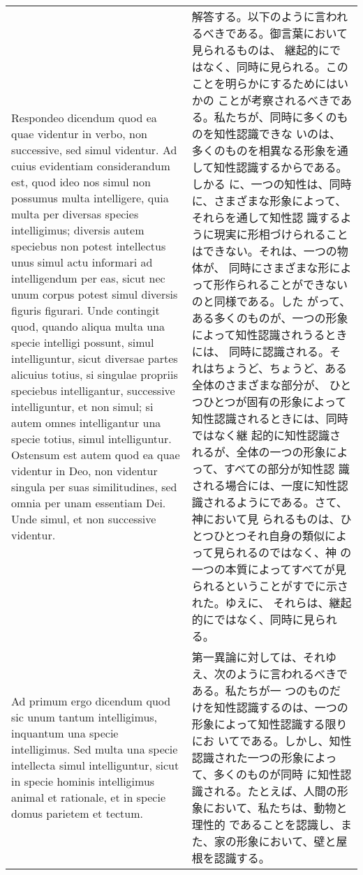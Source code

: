 \documentclass[10pt]{jsarticle} %
\begin{document}
\begin{longtable}{p{21em}p{21em}}
{\sc Respondeo dicendum} quod ea quae videntur in verbo, non
successive, sed simul videntur. Ad cuius evidentiam considerandum est,
quod ideo nos simul non possumus multa intelligere, quia multa per
diversas species intelligimus; diversis autem speciebus non potest
intellectus unus simul actu informari ad intelligendum per eas, sicut
nec unum corpus potest simul diversis figuris figurari. Unde contingit
quod, quando aliqua multa una specie intelligi possunt, simul
intelliguntur, sicut diversae partes alicuius totius, si singulae
propriis speciebus intelligantur, successive intelliguntur, et non
simul; si autem omnes intelligantur una specie totius, simul
intelliguntur. Ostensum est autem quod ea quae videntur in Deo, non
videntur singula per suas similitudines, sed omnia per unam essentiam
Dei. Unde simul, et non successive videntur.


&

解答する。以下のように言われるべきである。御言葉において見られるものは、
継起的にではなく、同時に見られる。このことを明らかにするためにはいかの
ことが考察されるべきである。私たちが、同時に多くのものを知性認識できな
いのは、多くのものを相異なる形象を通して知性認識するからである。しかる
に、一つの知性は、同時に、さまざまな形象によって、それらを通して知性認
識するように現実に形相づけられることはできない。それは、一つの物体が、
同時にさまざまな形によって形作られることができないのと同様である。した
がって、ある多くのものが、一つの形象によって知性認識されうるときには、
同時に認識される。それはちょうど、ちょうど、ある全体のさまざまな部分が、
ひとつひとつが固有の形象によって知性認識されるときには、同時ではなく継
起的に知性認識されるが、全体の一つの形象によって、すべての部分が知性認
識される場合には、一度に知性認識されるようにである。さて、神において見
られるものは、ひとつひとつそれ自身の類似によって見られるのではなく、神
の一つの本質によってすべてが見られるということがすでに示された。ゆえに、
それらは、継起的にではなく、同時に見られる。


\\



{\sc Ad primum ergo dicendum} quod sic unum tantum intelligimus,
inquantum una specie intelligimus. Sed multa una specie intellecta
simul intelliguntur, sicut in specie hominis intelligimus animal et
rationale, et in specie domus parietem et tectum.


&

第一異論に対しては、それゆえ、次のように言われるべきである。私たちが一
つのものだけを知性認識するのは、一つの形象によって知性認識する限りにお
いてである。しかし、知性認識された一つの形象によって、多くのものが同時
に知性認識される。たとえば、人間の形象において、私たちは、動物と理性的
であることを認識し、また、家の形象において、壁と屋根を認識する。



\end{longtable}
\end{document}
